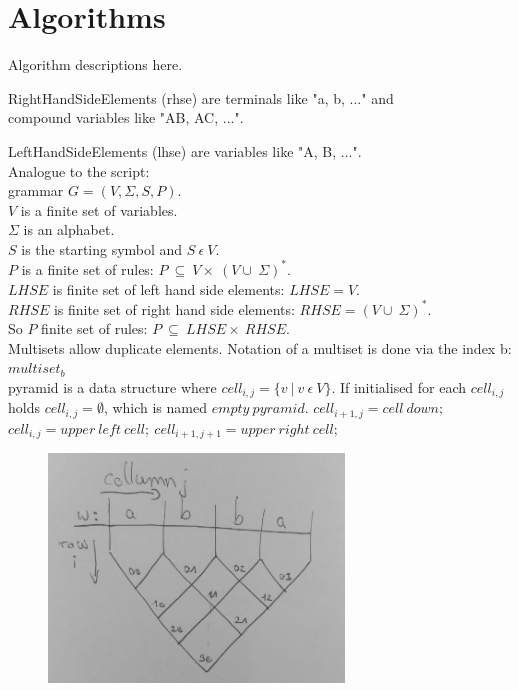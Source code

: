 
\section{Algorithms}\label{algorithms}
Algorithm descriptions here.

\noindent RightHandSideElements (rhse) are terminals like "a, b, ..." and \\
compound variables like "AB, AC, ...".

\noindent LeftHandSideElements (lhse) are variables like "A, B, ...".\\

\noindent Analogue to the script: \\
grammar $G=(V,\Sigma , S, P)$.\\
$V$ is a finite set of variables. \\
$\Sigma$ is an alphabet. \\
$S$ is the starting symbol and $S\ \epsilon\ V$. \\
$P$ is a finite set of rules: $P\ \subseteq\ V \times\ (V \cup\ \Sigma)^{*}$. \\ 
$LHSE$ is finite set of left hand side elements: $LHSE = V$.\\
$RHSE$ is finite set of right hand side elements: $RHSE = (V \cup\ \Sigma)^{*}$.\\
So $P$ finite set of rules: $P\ \subseteq\ LHSE \times\ RHSE$. \\
Multisets allow duplicate elements. Notation of a multiset is done via the index b: $multiset_b$\\
pyramid is a data structure where $cell_{i,j} = \{v\ |\ v\ \epsilon\ V\}$. If initialised for each $cell_{i,j}$ holds $cell_{i,j} = \emptyset $, which is named $empty\ pyramid$. $cell_{i+1,j} = cell\ down;$ $cell_{i,j} = upper\ left\ cell;\ cell_{i+1,j+1} = upper\ right\ cell;  $


\begin{figure}[h]
	\centering
	\includegraphics[width=0.7\textwidth]{abb/DataStructurePyramid}
\end{figure}


